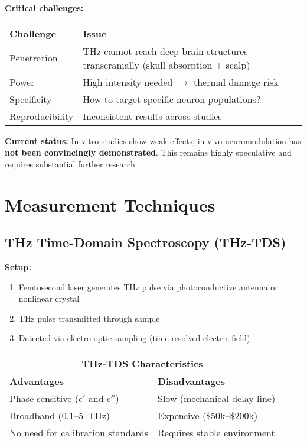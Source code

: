 \textbf{Critical challenges:}

\begin{center}
\begin{tabular}{@{}lp{7cm}@{}}
\toprule
Challenge & Issue \\
\midrule
Penetration & THz cannot reach deep brain structures transcranially (skull absorption + scalp) \\
Power & High intensity needed $\rightarrow$ thermal damage risk \\
Specificity & How to target specific neuron populations? \\
Reproducibility & Inconsistent results across studies \\
\bottomrule
\end{tabular}
\end{center}

\begin{warningbox}
\textbf{Current status:} In vitro studies show weak effects; in vivo neuromodulation has \textbf{not been convincingly demonstrated}. This remains highly speculative and requires substantial further research.
\end{warningbox}

\section{Measurement Techniques}
\label{sec:measurement-techniques}

\subsection{THz Time-Domain Spectroscopy (THz-TDS)}
\label{subsec:thz-tds}

\textbf{Setup:}
\begin{enumerate}
\item Femtosecond laser generates THz pulse via photoconductive antenna or nonlinear crystal
\item THz pulse transmitted through sample
\item Detected via electro-optic sampling (time-resolved electric field)
\end{enumerate}

\begin{center}
\begin{tabular}{@{}ll@{}}
\toprule
\multicolumn{2}{c}{\textbf{THz-TDS Characteristics}} \\
\midrule
\textbf{Advantages} & \textbf{Disadvantages} \\
\midrule
Phase-sensitive ($\epsilon'$ and $\epsilon''$) & Slow (mechanical delay line) \\
Broadband (0.1--5~THz) & Expensive (\$50k--\$200k) \\
No need for calibration standards & Requires stable environment \\
\bottomrule
\end{tabular}
\end{center}


